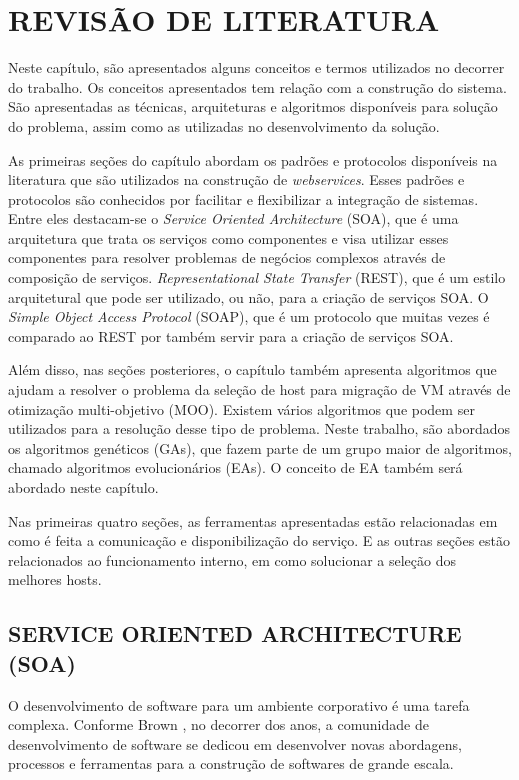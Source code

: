 \chapter{REVISÃO DE LITERATURA}
\label{chap:fundamentacaoTeorica}

Neste capítulo, são apresentados alguns conceitos e termos utilizados no decorrer do trabalho. 
Os conceitos apresentados tem relação com a construção do sistema. São apresentadas as 
técnicas, arquiteturas e algoritmos disponíveis para solução do problema, assim como as utilizadas no 
desenvolvimento da solução.

As primeiras seções do capítulo abordam os padrões e protocolos disponíveis na literatura que são 
utilizados na construção de \textit{webservices}.  Esses padrões e protocolos 
são conhecidos por facilitar e flexibilizar a integração de sistemas. 
Entre eles destacam-se o \textit{Service Oriented Architecture} (SOA), que é
uma arquitetura que trata os serviços como componentes e visa utilizar 
esses componentes para resolver problemas de negócios complexos através de composição
de serviços. \textit{Representational State Transfer} (REST), que é um estilo arquitetural 
que pode ser utilizado, ou não, para a criação de serviços SOA. O \textit{Simple Object Access Protocol}
(SOAP), que é um protocolo que muitas vezes é comparado ao REST por também servir
para a criação de serviços SOA.

Além disso, nas seções posteriores, o capítulo também apresenta algoritmos que ajudam a 
resolver o problema da seleção de host para migração de VM através de otimização multi-objetivo (MOO). 
Existem vários algoritmos que podem ser utilizados para a resolução desse tipo de problema. 
Neste trabalho, são abordados os algoritmos genéticos (GAs), que fazem parte de um grupo 
maior de algoritmos, chamado algoritmos evolucionários (EAs). 
O conceito de EA também será abordado neste capítulo.

Nas primeiras quatro seções, as ferramentas apresentadas 
estão relacionadas em como é feita a comunicação e disponibilização do serviço. 
E as outras seções estão relacionados ao funcionamento interno, em como solucionar
a seleção dos melhores hosts.

\section{SERVICE ORIENTED ARCHITECTURE (SOA)}
O desenvolvimento de software para um ambiente corporativo é uma tarefa complexa. 
Conforme Brown \cite{brown}, no decorrer dos anos, a comunidade de desenvolvimento de software se 
dedicou em desenvolver novas abordagens, processos e ferramentas para a construção de softwares de 
grande escala. 

